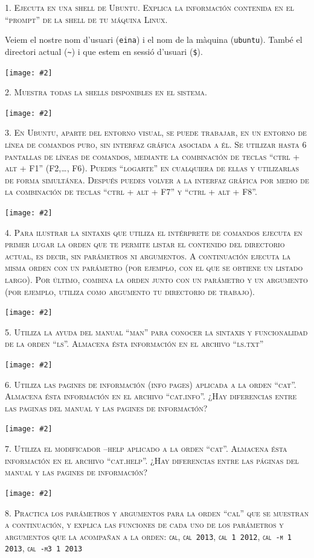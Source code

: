 \documentclass[a4paper,12pt]{article}
\newcommand{\mygraphic}[2][height=0.45\textheight]{\begin{center}
		\centering\texttt{[image: \#2]}\par
\end{center}}
\begin{document}


\newpage
\textsc{1. Ejecuta en una shell de Ubuntu. Explica la información contenida en el “prompt” de la shell de tu máquina Linux.}

Veiem el nostre nom d'usuari (\texttt{eina}) i el nom de la màquina (\texttt{ubuntu}). També el directori actual (\texttt{\~}) i que estem en sessió d'usuari (\texttt{\$}).
\mygraphic{imatges/1.png}

\newpage
\textsc{2. Muestra todas la shells disponibles en el sistema.}
\mygraphic{imatges/2.png}

\newpage
\textsc{3. En Ubuntu, aparte del entorno visual, se puede trabajar, en un entorno de línea de comandos puro, sin interfaz gráfica asociada a él. Se utilizar hasta 6 pantallas de líneas de comandos, mediante la combinación de teclas “ctrl + alt + F1” (F2,…, F6). Puedes “logarte” en cualquiera de ellas y utilizarlas de forma simultánea.  Después puedes volver a la interfaz gráfica por medio de la combinación de teclas “ctrl + alt + F7” y “ctrl + alt + F8”.}
\mygraphic{imatges/3.png}

\newpage
\textsc{4. Para ilustrar la sintaxis que utiliza el intérprete de comandos ejecuta en primer lugar la orden que te permite listar el contenido del directorio actual, es decir, sin parámetros ni argumentos. A continuación ejecuta la misma orden con un parámetro (por ejemplo, con el que se obtiene un listado largo). Por último, combina la orden junto con un parámetro y un argumento (por ejemplo, utiliza como argumento tu directorio de trabajo).}
\mygraphic{imatges/4.png}

\newpage
\textsc{5. Utiliza la ayuda del manual “man” para conocer la sintaxis y funcionalidad de la orden “ls”. Almacena ésta información en el archivo “ls.txt”}
\mygraphic{imatges/5.png}

\newpage
\textsc{6. Utiliza las pagines de información (info pages) aplicada a la orden “cat”. Almacena ésta información en el archivo “cat.info”. ¿Hay diferencias entre las paginas del manual y las pagines de información?}
\mygraphic{imatges/6.png}

\newpage
\textsc{7. Utiliza el modificador --help aplicado a la orden “cat”. Almacena ésta información en el archivo “cat.help”. ¿Hay diferencias entre las páginas del manual y las pagines de información?}
\mygraphic{imatges/7.png}


\newpage
\textsc{8. Practica los parámetros y argumentos para la orden “cal” que se muestran a continuación,  y explica las  funciones de cada uno de los parámetros y argumentos que la acompañan a la orden: \texttt{cal}, \texttt{cal 2013}, \texttt{cal 1 2012}, \texttt{cal -m 1 2013}, \texttt{cal -m3 1 2013}}
\end{document}
